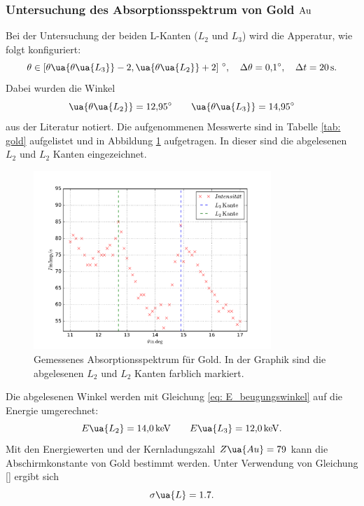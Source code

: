 \subsubsection{Untersuchung des Absorptionsspektrum von Gold $\ce{Au}$}
Bei der Untersuchung der beiden L-Kanten ($L_2$ und $L_3$) wird die Apperatur, wie folgt
konfiguriert:
\begin{equation*}
  \theta\in\left[\theta\ua{\theta\ua{L_3}}-2,\ua{\theta\ua{L_2}}+2\right]\,\si{\degree},\quad \Delta\theta=\SI{0.1}{\degree}, \quad \Delta t=\SI{20}{\second}.
\end{equation*}
Dabei wurden die Winkel
\begin{equation*}
  \ua{\theta\ua{L_2}}=\SI{12.95}{\degree} \qquad  \ua{\theta\ua{L_3}}=\SI{14.95}{\degree}
\end{equation*}
aus der Literatur \cite{l_kante} notiert.
Die aufgenommenen Messwerte sind in Tabelle \ref{tab: gold} aufgelistet und in Abbildung
\ref{fig: absotp_gold} aufgetragen. In dieser sind die abgelesenen $L_2$ und $L_2$ Kanten eingezeichnet.

\begin{figure}
  \centering
  \includegraphics[width=0.8\textwidth]{../Messdaten/gold.pdf}
  \caption{Gemessenes Absorptionsspektrum für Gold. In der Graphik sind die abgelesenen $L_2$ und $L_2$ Kanten farblich markiert.} %
  \label{fig: absotp_gold}
\end{figure}
Die abgelesenen Winkel werden mit Gleichung \eqref{eq: E_beugungswinkel} auf die Energie umgerechnet:
\begin{equation}
  \label{eq:l_kanten_gold}
  E\ua{L_2}=\SI{14.0}{\kilo\eV}  \qquad   E\ua{L_3}=\SI{12.0}{\kilo\eV}.
\end{equation}
Mit den Energiewerten und der Kernladungszahl $Z\ua{Au}=79$ kann die Abschirmkonstante
von Gold bestimmt werden. Unter Verwendung von Gleichung \eqref{} ergibt sich
\begin{equation*}
    \sigma\ua{L}=1.7.
\end{equation*}


